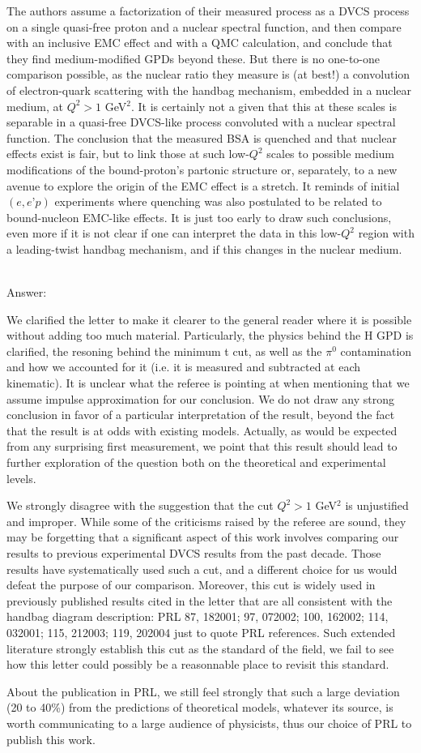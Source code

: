 \documentclass{article}
\begin{document}
{The authors assume a factorization of their measured process as a DVCS process on a single quasi-free proton and a nuclear spectral function, and then compare with an inclusive EMC effect and with a QMC calculation, and conclude that they find medium-modified GPDs beyond these. But there is no one-to-one comparison possible, as the nuclear ratio they measure is (at best!) a convolution of electron-quark scattering with the handbag mechanism, embedded in a nuclear medium, at $Q^2 > 1 $ GeV$^2$. It is certainly not a given that this at these scales is separable in a quasi-free DVCS-like process convoluted with a nuclear spectral function. The conclusion that the measured BSA is quenched and that nuclear effects exist is fair, but to link those at such low-$Q^2$ scales to possible medium modifications of the bound-proton’s partonic structure or, separately, to a new avenue to explore the origin of the EMC effect is a stretch. It reminds of initial $(e,e’p)$ experiments where quenching was also postulated to be related to bound-nucleon EMC-like effects. It is just too early to draw such conclusions, even more if it is not clear if one can interpret the data in this low-$Q^2$ region with a leading-twist handbag mechanism, and if this changes in the nuclear medium.}

\noindent \\
Answer:

We clarified the letter to make it clearer to the general reader where it is possible without adding too much material. Particularly, the physics behind the H GPD is clarified, the resoning behind the minimum t cut, as well as the $\pi^0$ contamination and how we accounted for it (i.e. it is measured and subtracted at each kinematic). It is unclear what the referee is pointing at when mentioning that we assume impulse approximation for our conclusion. We do not draw any strong conclusion in favor of a particular interpretation of the result, beyond the fact that the result is at odds with existing models. Actually, as would be expected from any surprising first measurement, we point that this result should lead to further exploration of the question both on the theoretical and experimental levels. 

We strongly disagree with the suggestion that the cut $Q^2 > 1$ GeV$^2$ is unjustified and improper. While some of the criticisms raised by the referee are sound, they may be forgetting that a significant aspect of this work involves comparing our results to previous experimental DVCS results from the past decade. Those results have systematically used such a cut, and a different choice for us would defeat the purpose of our comparison. Moreover, this cut is widely used in previously published results cited in the letter that are all consistent with the handbag diagram description: PRL 87, 182001; 97, 072002; 100, 162002; 114, 032001; 115, 212003; 119, 202004 just to quote PRL references. Such extended literature strongly establish this cut as the standard of the field, we fail to see how this letter could possibly be a reasonnable place to revisit this standard. 

About the publication in PRL, we still feel strongly that such a large deviation (20 to 40\%) from the predictions of theoretical models, whatever its source, is worth communicating to a large audience of physicists, thus our choice of PRL to publish this work.
\end{document}
